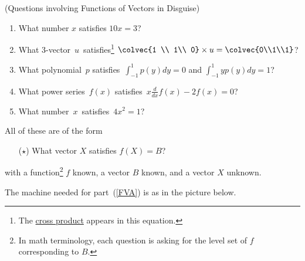 \begin{example}  \label{EX}
(Questions involving Functions of Vectors in Disguise)\\
\begin{enumerate}\renewcommand{\theenumi}{(\Alph*{enumi})}
\item\label{FVA}What number $x$ satisfies $10x=3$?
\item\label{FVB} What 3-vector~$u\!\, $  satisfies\footnote{ The \hyperlink{crossprod}{cross product} appears in this equation.}~$\!\colvec{1 \\ 1\\ 0} \times u = \colvec{0\\1\\1}$?\\[-.4cm]
\item \label{FVC}What polynomial~$p$ satisfies~$\int_{-1}^1  p(y) dy = 0$ and $\int_{-1}^1 y p(y) dy=1$?\\
\item \label{FVD}What power series~$f(x)$ satisfies~$x\frac{d}{dx} f(x) -2f(x)=0$?
\item What number~$x$~satisfies~$4 x^2=1$?
\end{enumerate}
\vspace{.3cm}
All of these are of the form 
\begin{itemize}
\item[($\star$)] What vector $X$ satisfies $f(X)=B$?
\end{itemize}
with a function\footnote{In math terminology, each question is asking for the level set of $f$ corresponding to $B$.} $f$ known, a vector $B$ known, and a vector $X$ unknown.
\end{example}
The machine needed for part~(\ref{FVA}) is as in the picture below. 
